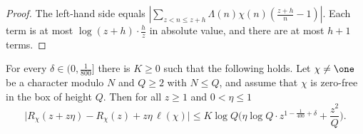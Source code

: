 \begin{proof}
The left-hand side equals $|\sum_{z<n\le z+h}\Lambda(n)\chi(n)(\frac{z+h}n-1)|$. Each term is at most
$\log(z+h)\cdot\frac hz$ in absolute value, and there are at most $h+1$ terms.
\end{proof}

\begin{proposition}\label{pf:top-supply:contour}
For every $\delta\in(0,\frac1{800}]$ there is $K\ge0$ such that the following holds. Let $\chi\ne\one$ be a character
modulo $N$ and $Q\ge2$ with $N\le Q$, and assume that $\chi$ is zero-free in the box of height $Q$. Then for all
$z\ge1$ and $0<\eta\le1$
\[
\big|R_\chi(z+z\eta)-R_\chi(z)+z\eta\,\ell(\chi)\big|\le K\log Q\Big(\eta\log Q\cdot z^{1-\frac1{400}+\delta}+\frac{z^2}Q\Big).
\]
\end{proposition}

